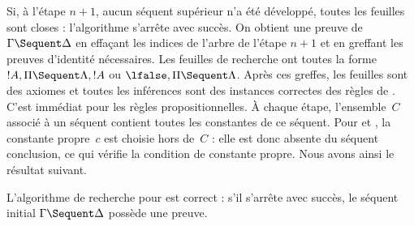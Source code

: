 \documentclass[../../../include/open-logic-section]{subfiles}
\begin{document}
Si, à l'étape $n+1$, aucun séquent supérieur n'a
été développé, toutes les feuilles sont closes :
l'algorithme s'arrête avec succès. On obtient
une preuve de~$\Gamma \Sequent \Delta$ en effaçant
les indices de l'arbre de l'étape $n+1$ et en
greffant les preuves d'identité nécessaires.
Les feuilles de recherche ont toutes la forme
$!A, \Pi \Sequent \Lambda, !A$ ou
$\lfalse, \Pi \Sequent \Lambda$.
Après ces greffes, les feuilles sont des axiomes
et toutes les inférences sont des instances correctes
des règles de . C'est immédiat pour les
règles propositionnelles. À chaque étape, l'ensemble~$C$
associé à un séquent contient toutes les constantes
de ce séquent. Pour \LeftR{\lexists} et \RightR{\lforall},
la constante propre~$c$ est choisie hors de~$C$ :
elle est donc absente du séquent conclusion, ce
qui vérifie la condition de constante propre.
Nous avons ainsi le résultat suivant.

\begin{prop}
L'algorithme de recherche pour  est correct :
s'il s'arrête avec succès, le séquent initial
$\Gamma \Sequent \Delta$ possède une preuve.
\end{prop}
\end{document}
